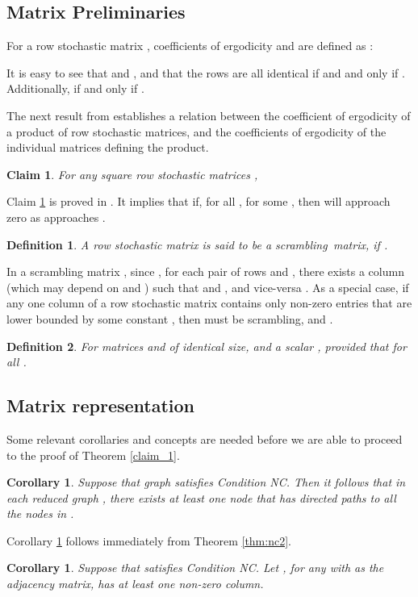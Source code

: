 \documentclass[letterpaper, 11pt]{article}
\newtheorem{definition}{Definition}[section]
\newtheorem{corollary}[theorem]{Corollary}
\newtheorem{claim}[theorem]{Claim}
\begin{document}
\subsection{Matrix Preliminaries}\label{MatrixPreliminaries}




For a row stochastic matrix ,
 coefficients of ergodicity  and  are defined as
\cite{Wolfowitz}:

It  is easy to see that   and , and that the rows are all identical if and and only if . Additionally,  if and only if .


The next result from \cite{Hajnal58} establishes a relation between the coefficient of ergodicity  of a product of row stochastic matrices, and the coefficients of ergodicity  of the individual matrices defining the product.

\begin{claim}
\label{claim_delta}
For any  square row stochastic matrices ,

\end{claim}
Claim \ref{claim_delta} is proved in \cite{Hajnal58}. It implies that
if, for all ,  for some , then  will approach zero as  approaches .


\begin{definition}
A row stochastic
 matrix  is said to be a {\em scrambling}\, matrix, if 
{\normalfont \cite{Hajnal58,Wolfowitz}}.
\end{definition}

In a scrambling matrix , since , for each pair of
rows  and , there exists a column  (which may depend on
 and ) such that
  and , and vice-versa \cite{Hajnal58,Wolfowitz}.
As a special case, if any one column of a row stochastic matrix 
contains only non-zero entries that are lower bounded by some
constant , then  must be scrambling, and .

\begin{definition}
For matrices  and  of identical size, and
a scalar ,  provided
that  for all .
\end{definition}

\subsection{Matrix representation}\label{app:claim_1}
Some relevant corollaries and concepts are needed before we are able to proceed to the proof of Theorem \ref{claim_1}.  

\begin{corollary}
\label{claim_suff}
Suppose that graph  satisfies Condition NC. Then it follows that in each reduced graph ,
there exists at least one node that has directed paths to all the nodes in .
\end{corollary}
Corollary \ref{claim_suff} follows immediately from Theorem \ref{thm:nc2}.
\begin{corollary}
\label{l_one_column}
Suppose that  satisfies Condition NC. Let , for any  with  as the adjacency matrix,  has at least one non-zero column.
\end{corollary}
\end{document}
